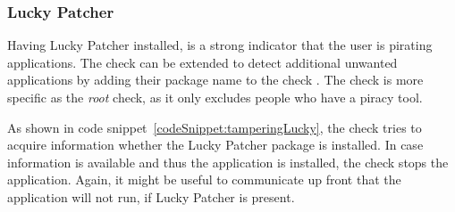 \subsubsection{Lucky Patcher} \label{subsection:counter-improve-tampering-luckypatcher}
Having Lucky Patcher installed, is a strong indicator that the user is pirating applications.
The check can be extended to detect additional unwanted applications by adding their package name to the check \cite{androidCrackingTools}.
The check is more specific as the \textit{root} check, as it only excludes people who have a piracy tool.
\newline

As shown in code snippet~\ref{codeSnippet:tamperingLucky}, the check tries to acquire information whether the Lucky Patcher package is installed.
In case information is available and thus the application is installed, the check stops the application.
Again, it might be useful to communicate up front that the application will not run, if Lucky Patcher is present.
